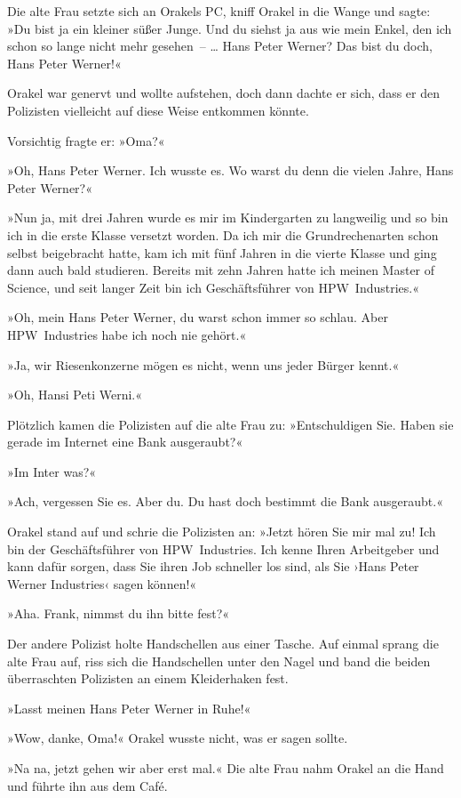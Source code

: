 Die alte Frau setzte sich an Orakels PC, kniff Orakel in die Wange und sagte: »Du bist ja ein kleiner süßer Junge. Und du siehst ja aus wie mein Enkel, den ich schon so lange nicht mehr gesehen~– … Hans Peter Werner? Das bist du doch, Hans Peter Werner!«

Orakel war genervt und wollte aufstehen, doch dann dachte er sich, dass er den Polizisten vielleicht auf diese Weise entkommen könnte.

Vorsichtig fragte er: »Oma?«

»Oh, Hans Peter Werner. Ich wusste es. Wo warst du denn die vielen Jahre, Hans Peter Werner?«

»Nun ja, mit drei Jahren wurde es mir im Kindergarten zu langweilig und so bin ich in die erste Klasse versetzt worden. Da ich mir die Grundrechenarten schon selbst beigebracht hatte, kam ich mit fünf Jahren in die vierte Klasse und ging dann auch bald studieren. Bereits mit zehn Jahren hatte ich meinen Master of Science, und seit langer Zeit bin ich Geschäftsführer von HPW~Industries.«

»Oh, mein Hans Peter Werner, du warst schon immer so schlau. Aber HPW~Industries habe ich noch nie gehört.«

»Ja, wir Riesenkonzerne mögen es nicht, wenn uns jeder Bürger kennt.«

»Oh, Hansi Peti Werni.«

Plötzlich kamen die Polizisten auf die alte Frau zu: »Entschuldigen Sie. Haben sie gerade im Internet eine Bank ausgeraubt?«

»Im Inter was?«

»Ach, vergessen Sie es. Aber du. Du hast doch bestimmt die Bank ausgeraubt.«

Orakel stand auf und schrie die Polizisten an: »Jetzt hören Sie mir mal zu! Ich bin der Geschäftsführer von HPW~Industries. Ich kenne Ihren Arbeitgeber und kann dafür sorgen, dass Sie ihren Job schneller los sind, als Sie ›Hans Peter Werner Industries‹ sagen können!«

»Aha. Frank, nimmst du ihn bitte fest?«

Der andere Polizist holte Handschellen aus einer Tasche. Auf einmal sprang die alte Frau auf, riss sich die Handschellen unter den Nagel und band die beiden überraschten Polizisten an einem Kleiderhaken fest.

»Lasst meinen Hans Peter Werner in Ruhe!«

»Wow, danke, Oma!« Orakel wusste nicht, was er sagen sollte.

»Na na, jetzt gehen wir aber erst mal.« Die alte Frau nahm Orakel an die Hand und führte ihn aus dem Café.

